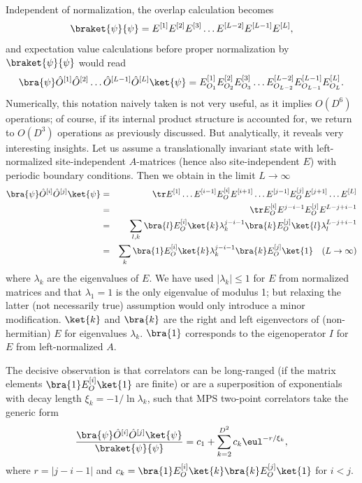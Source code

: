 Independent of normalization, the overlap calculation becomes
\begin{equation}
\braket{\psi}{\psi} = E^{[1]} E^{[2]} E^{[3]} \ldots E^{[L-2]} E^{[L-1]} E^{[L]}  ,
\end{equation}
and expectation value calculations before proper normalization by $\braket{\psi}{\psi}$ would read
\begin{equation}
\bra{\psi} \hat{O}^{[1]} \hat{O}^{[2]} \ldots \hat{O}^{[L-1]} \hat{O}^{[L]}\ket{\psi} = E^{[1]}_{O_1} E^{[2]}_{O_2} E^{[3]}_{O_3} \ldots E^{[L-2]}_{O_{L-2}} E^{[L-1]}_{O_{L-1}} E^{[L]}_{O_L}  .
\end{equation}
Numerically, this notation naively taken is not very useful, as it implies $O(D^6)$ operations; of course, if its internal product structure is accounted for, we return to $O(D^3)$ operations as previously discussed. But analytically, it reveals very interesting insights. Let us assume a translationally invariant state with left-normalized site-independent $A$-matrices (hence also site-independent $E$) with periodic boundary conditions. Then we obtain in the limit $L\rightarrow\infty$
\begin{eqnarray*}
\bra{\psi} \hat{O}^{[i]}\hat{O}^{[j]} \ket{\psi} &=& \tr E^{[1]} \ldots E^{[i-1]} E^{[i]}_O E^{[i+1]} \ldots E^{[j-1]} 
E^{[j]}_O E^{[j+1]} \ldots E^{[L]} \\
&=& \tr E^{[i]}_O E^{j-i-1} E^{[j]}_O E^{L-j+i-1} \\
&=& \sum_{l,k} \bra{l} E^{[i]}_O \ket{k} \lambda_k^{j-i-1} \bra{k} E^{[j]}_O \ket{l} \lambda_l^{L-j+i-1}\\
&=& \sum_k \bra{1} E^{[i]}_O \ket{k} \lambda_k^{j-i-1} \bra{k} E^{[j]}_O \ket{1} \quad (L\rightarrow\infty)
\end{eqnarray*}
where $\lambda_k$ are the eigenvalues of $E$. We have used $|\lambda_k|\leq 1$ for $E$ from normalized matrices and that $\lambda_1=1$ is the only eigenvalue of modulus 1; but relaxing the latter (not necessarily true) assumption would only introduce a minor modification. $\ket{k}$ and $\bra{k}$ are the right and left eigenvectors of (non-hermitian) $E$ for eigenvalues $\lambda_k$. $\bra{1}$ corresponds to the eigenoperator $I$ for $E$ from left-normalized $A$.

The decisive observation is that correlators can be long-ranged (if the matrix elements  $ \bra{1} E^{[i]}_O \ket{1}$ are finite) or are a superposition of exponentials with decay length $\xi_k = -1/ \ln \lambda_k$, such that MPS two-point correlators take the generic form
\begin{equation}
\frac{\bra{\psi} \hat{O}^{[i]} \hat{O}^{[j]} \ket{\psi}}{\braket{\psi}{\psi}} = c_1 + \sum_{k=2}^{D^2} c_k \eul^{-r/\xi_k} ,
\end{equation}
where $r=|j-i-1|$ and $c_k = \bra{1} E^{[i]}_O \ket{k} \bra{k} E^{[j]}_O \ket{1}$ for $i<j$. 

